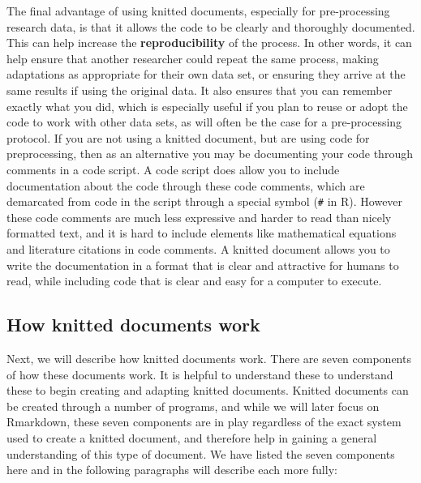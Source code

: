 \documentclass[]{tufte-book}
\begin{document}
The final advantage of using knitted documents, especially for pre-processing
research data, is that it allows the code to be clearly and thoroughly
documented. This can help increase the \textbf{reproducibility} of the process. In
other words, it can help ensure that another researcher could repeat the same
process, making adaptations as appropriate for their own data set, or ensuring
they arrive at the same results if using the original data. It also ensures that
you can remember exactly what you did, which is especially useful if you plan to
reuse or adopt the code to work with other data sets, as will often be the case
for a pre-processing protocol. If you are not using a knitted document, but are
using code for preprocessing, then as an alternative you may be documenting your
code through comments in a code script. A code script does allow you to include
documentation about the code through these code comments, which are demarcated
from code in the script through a special symbol (\texttt{\#} in R). However these code
comments are much less expressive and harder to read than nicely formatted text,
and it is hard to include elements like mathematical equations and literature
citations in code comments. A knitted document allows you to write the
documentation in a format that is clear and attractive for humans to read, while
including code that is clear and easy for a computer to execute.

\hypertarget{how-knitted-documents-work}{%
\subsection{How knitted documents work}\label{how-knitted-documents-work}}

Next, we will describe how knitted documents work. There are seven components of
how these documents work. It is helpful to understand these to understand these
to begin creating and adapting knitted documents. Knitted documents can be
created through a number of programs, and while we will later focus on
Rmarkdown, these seven components are in play regardless of the exact system
used to create a knitted document, and therefore help in gaining a general
understanding of this type of document. We have listed the seven components here
and in the following paragraphs will describe each more fully:
\end{document}
